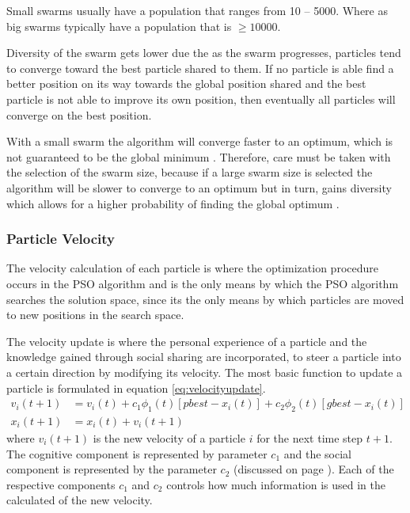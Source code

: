 Small swarms usually have a population that ranges from 10 -- 5000. Where as big swarms typically have a population that is $\geq 10000$\cite{PSOSelfHierarch,PSOPheromones,PSOAttractRepulse}. 

Diversity of the swarm gets lower due the as the swarm progresses, particles tend to converge toward the best particle shared to them. If no particle is able find a better position on its way towards the global position shared and the best particle is not able to improve its own position, then eventually all particles will converge on the best position\cite{CompuIntelligenceIntro,FundamentalSwarm}.

With a small swarm the algorithm will converge faster to an optimum, which is not guaranteed to be the global minimum \cite{FundamentalSwarm,CompuIntelligenceIntro}. Therefore, care must be taken with the selection of the swarm size, because if a large swarm size is selected the algorithm will be slower to converge to an optimum but in turn, gains diversity which allows for a higher probability of finding the global optimum \cite{PSOPESO}.
\subsubsection{Particle Velocity}
\label{sec:particleVelocity}
The velocity calculation of each particle is where the optimization procedure occurs in the PSO algorithm and is the only means by which the PSO algorithm searches the solution space, since its the only means by which particles are moved to new positions in the search space\cite{CompuIntelligenceIntro}.

The velocity update is where the personal experience of a particle and the knowledge gained through social sharing are incorporated, to steer a particle into a certain direction by modifying its velocity. The most basic function to update a particle is formulated in equation \ref{eq:velocityupdate}.
\begin{align}
v_i(t+1) &= v_i(t) + c_1\phi_{1}(t)[pbest - x_i(t)] + c_2\phi_{2}(t)[gbest - x_i(t)]\label{eq:velocityupdate}\\
x_i(t+1) &= x_i(t) + v_i(t+1)\label{eq:positionupdate}
\end{align}
where $v_i(t+1)$ is the new velocity of a particle $i$ for the next time step $t+1$. The cognitive component is represented by parameter $c_1$ and the social component is represented by the parameter $c_2$ (discussed on page \pageref{def:cognitivecomponent})\cite{FundamentalSwarm,CompuIntelligenceIntro}. Each of the respective components $c_1$ and $c_2$ controls how much information is used in the calculated of the new velocity. 

